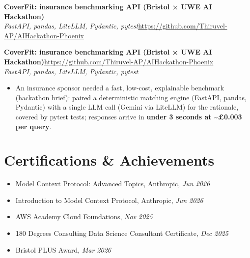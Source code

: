 \documentclass[a4paper,11pt]{article}
\newcommand{\project}[3]{%
  \textbf{#1}\hfill#3\\ {\color{muted}\small\textit{#2}}\par}
\newcommand{\num}[1]{\textbf{#1}}   %
\begin{document}
\else
\textbf{CoverFit: insurance benchmarking API (Bristol × UWE AI Hackathon)}\\ {\color{muted}\small\textit{FastAPI, pandas, LiteLLM, Pydantic, pytest}}\hfill{\small\url{https://github.com/Thiruvel-AP/AIHackathon-Phoenix}}\par
\fi
\else
\project{CoverFit: insurance benchmarking API (Bristol × UWE AI Hackathon)}{FastAPI, pandas, LiteLLM, Pydantic, pytest}{\url{https://github.com/Thiruvel-AP/AIHackathon-Phoenix}}
\fi
\begin{itemize}
  \item An insurance sponsor needed a fast, low-cost, explainable benchmark (hackathon brief): paired a deterministic matching engine (FastAPI, pandas, Pydantic) with a single LLM call (Gemini via LiteLLM) for the rationale, covered by pytest tests; responses arrive in \num{under 3 seconds at \textasciitilde{}£0.003 per query}.
\end{itemize}


\section{Certifications \& Achievements}
\begin{itemize}
  \item Model Context Protocol: Advanced Topics, Anthropic, \textit{Jun 2026}
  \item Introduction to Model Context Protocol, Anthropic, \textit{Jun 2026}
  \item AWS Academy Cloud Foundations, \textit{Nov 2025}
  \item 180 Degrees Consulting Data Science Consultant Certificate, \textit{Dec 2025}
  \item Bristol PLUS Award, \textit{Mar 2026}
\end{itemize}
\end{document}
